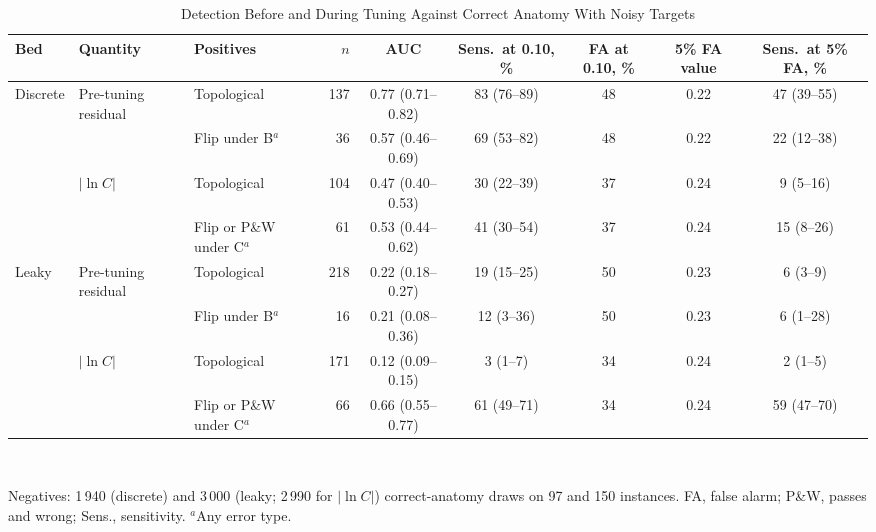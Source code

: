 \documentclass[journal,twoside,web,onecolumn]{ieeecolor}
\begin{document}
\begin{table}[!ht]
\caption{Detection Before and During Tuning Against Correct Anatomy With Noisy Targets}\label{tab:detector}
\centering\small\setlength{\tabcolsep}{4pt}
\begin{tabular}{@{}lllrccccc@{}}
\toprule
Bed & Quantity & Positives & $n$ & AUC & Sens.\ at 0.10, \% & FA at 0.10, \% & 5\% FA value & Sens.\ at 5\% FA, \%\\
\midrule
Discrete & Pre-tuning residual & Topological & 137 & 0.77 (0.71--0.82) & 83 (76--89) & 48 & 0.22 & 47 (39--55) \\
 &  & Flip under B$^a$ & 36 & 0.57 (0.46--0.69) & 69 (53--82) & 48 & 0.22 & 22 (12--38) \\
 & $|\ln C|$ & Topological & 104 & 0.47 (0.40--0.53) & 30 (22--39) & 37 & 0.24 & 9 (5--16) \\
 &  & Flip or P\&W under C$^a$ & 61 & 0.53 (0.44--0.62) & 41 (30--54) & 37 & 0.24 & 15 (8--26) \\
\addlinespace[2pt]
Leaky & Pre-tuning residual & Topological & 218 & 0.22 (0.18--0.27) & 19 (15--25) & 50 & 0.23 & 6 (3--9) \\
 &  & Flip under B$^a$ & 16 & 0.21 (0.08--0.36) & 12 (3--36) & 50 & 0.23 & 6 (1--28) \\
 & $|\ln C|$ & Topological & 171 & 0.12 (0.09--0.15) & 3 (1--7) & 34 & 0.24 & 2 (1--5) \\
 &  & Flip or P\&W under C$^a$ & 66 & 0.66 (0.55--0.77) & 61 (49--71) & 34 & 0.24 & 59 (47--70) \\
\bottomrule
\end{tabular}
\\[3pt]
\parbox{0.9\textwidth}{\footnotesize Negatives: 1\,940 (discrete) and 3\,000 (leaky; 2\,990 for $|\ln C|$) correct-anatomy draws on 97 and 150 instances. FA, false alarm; P\&W, passes and wrong; Sens., sensitivity. $^a$Any error type.}
\end{table}

\FloatBarrier
\end{document}

